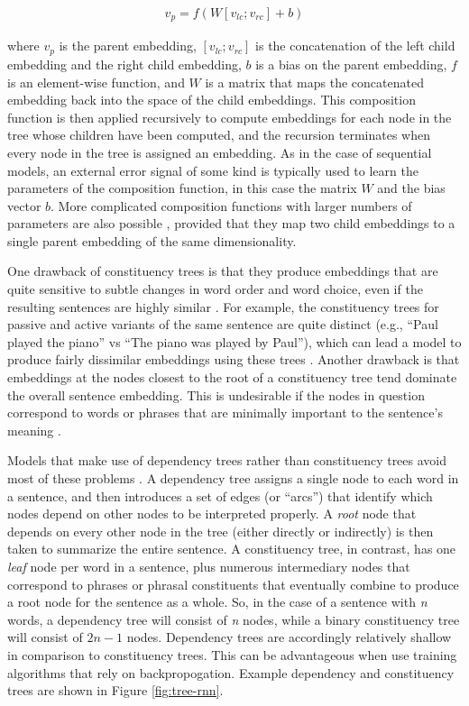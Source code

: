 \begin{align} 
\label{eqn:ct_rnn}
v_p = f (W [v_{lc}; v_{rc}] + b)
\end{align}

\noindent
where $v_p$ is the parent embedding, $[v_{lc}; v_{rc}]$ is the concatenation of the left child embedding and the right child embedding, $b$ is a bias on the parent embedding, $f$ is an element-wise function, and $W$ is a matrix that maps the concatenated embedding back into the space of the child embeddings. This composition function is then applied recursively to compute embeddings for each node in the tree whose children have been computed, and the recursion terminates when every node in the tree is assigned an embedding. As in the case of sequential models, an external error signal of some kind is typically used to learn the parameters of the composition function, in this case the matrix $W$ and the bias vector $b$. More complicated composition functions with larger numbers of parameters are also possible \citep[e.g.,][]{Tai:2015,Socher:2012}, provided that they map two child embeddings to a single parent embedding of the same dimensionality. 

One drawback of constituency trees is that they produce embeddings that are quite sensitive to subtle changes in word order and word choice, even if the resulting sentences are highly similar \citep{Socher:2014,Iyyer:2014}. For example, the constituency trees for passive and active variants of the same sentence are quite distinct (e.g., ``Paul played the piano'' vs ``The piano was played by Paul''), which can lead a model to produce fairly dissimilar embeddings using these trees \citep{Socher:2014}. Another drawback is that embeddings at the nodes closest to the root of a constituency tree tend dominate the overall sentence embedding. This is undesirable if the nodes in question correspond to words or phrases that are minimally important to the sentence's meaning \citep{Socher:2014}.

Models that make use of dependency trees rather than constituency trees avoid most of these problems \citep{Socher:2014}. A dependency tree assigns a single node to each word in a sentence, and then introduces a set of edges (or ``arcs'') that identify which nodes depend on other nodes to be interpreted properly. A \textit{root} node that depends on every other node in the tree (either directly or indirectly) is then taken to summarize the entire sentence. A constituency tree, in contrast, has one \textit{leaf} node per word in a sentence, plus numerous intermediary nodes that correspond to phrases or phrasal constituents that eventually combine to produce a root node for the sentence as a whole. So, in the case of a sentence with \textit{n} words, a dependency tree will consist of \textit{n} nodes, while a binary constituency tree will consist of $2n - 1$ nodes. Dependency trees are accordingly relatively shallow in comparison to constituency trees. This can be advantageous when use training algorithms that rely on backpropogation. Example dependency and constituency trees are shown in Figure \ref{fig:tree-rnn}. 

